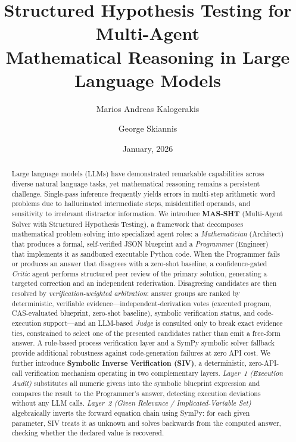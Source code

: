 \documentclass[11pt,a4paper]{article}
\title{%
    \textbf{Structured Hypothesis Testing for Multi-Agent\\
    Mathematical Reasoning in Large Language Models}
}
\author[1]{Marios Andreas Kalogerakis}
\author[1]{George Skiannis}
\affil[1]{Department of Computer Science, University of Ioannina, Ioannina, Greece}
\date{January, 2026}
\begin{document}
\maketitle
\begin{abstract}
Large language models (LLMs) have demonstrated remarkable capabilities across diverse natural language tasks, yet mathematical reasoning remains a persistent challenge.
Single-pass inference frequently yields errors in multi-step arithmetic word problems due to hallucinated intermediate steps, misidentified operands, and sensitivity to irrelevant distractor information.
We introduce \textbf{MAS-SHT} (Multi-Agent Solver with Structured Hypothesis Testing), a framework that decomposes mathematical problem-solving into specialized agent roles: a \emph{Mathematician} (Architect) that produces a formal, self-verified JSON blueprint and a \emph{Programmer} (Engineer) that implements it as sandboxed executable Python code.
When the Programmer fails or produces an answer that disagrees with a zero-shot baseline, a confidence-gated \emph{Critic} agent performs structured peer review of the primary solution, generating a targeted correction and an independent rederivation.
Disagreeing candidates are then resolved by \emph{verification-weighted arbitration}: answer groups are ranked by deterministic, verifiable evidence---independent-derivation votes (executed program, CAS-evaluated blueprint, zero-shot baseline), symbolic verification status, and code-execution support---and an LLM-based \emph{Judge} is consulted only to break exact evidence ties, constrained to select one of the presented candidates rather than emit a free-form answer.
A rule-based process verification layer and a SymPy symbolic solver fallback provide additional robustness against code-generation failures at zero API cost.
We further introduce \textbf{Symbolic Inverse Verification (SIV)}, a deterministic, zero-API-call verification mechanism operating in two complementary layers.
\emph{Layer~1 (Execution Audit)} substitutes all numeric givens into the symbolic blueprint expression and compares the result to the Programmer's answer, detecting execution deviations without any LLM calls.
\emph{Layer~2 (Given Relevance / Implicated-Variable Set)} algebraically inverts the forward equation chain using SymPy: for each given parameter, SIV treats it as unknown and solves backwards from the computed answer, checking whether the declared value is recovered.

\end{abstract}
\end{document}
